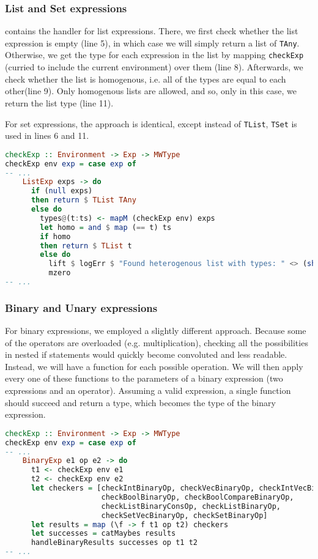 \subsubsection{List and Set expressions}
 contains the handler for list expressions. There, we first check whether the list expression is empty (line 5), in which case we will simply return a list of \lstinline{TAny}. Otherwise, we get the type for each expression in the list by mapping \lstinline{checkExp} (curried to include the current environment) over them (line 8). Afterwards, we check whether the list is homogenous, i.e. all of the types are equal to each other(line 9). Only homogenous lists are allowed, and so, only in this case, we return the list type (line 11). 
\par For set expressions, the approach is identical, except instead of \lstinline{TList}, \lstinline{TSet} is used in lines 6 and 11.
\begin{lstlisting}[language=haskell,
caption={Handler for list expressions},
label=lst:checker:lists]
checkExp :: Environment -> Exp -> MWType
checkExp env exp = case exp of
-- ...
    ListExp exps -> do
      if (null exps)
      then return $ TList TAny
      else do
        types@(t:ts) <- mapM (checkExp env) exps
        let homo = and $ map (== t) ts
        if homo
        then return $ TList t
        else do
          lift $ logErr $ "Found heterogenous list with types: " <> (show types)
          mzero
-- ...
\end{lstlisting}

\subsubsection{Binary and Unary expressions}
For binary expressions, we employed a slightly different approach. Because some of the operators are overloaded (e.g. multiplication), checking all the possibilities in nested if statements would quickly become convoluted and less readable. Instead, we will have a function for each possible operation. We will then apply every one of these functions to the parameters of a binary expression (two expressions and an operator). Assuming a valid expression, a single function should succeed and return a type, which becomes the type of the binary expression.

\begin{lstlisting}[language=haskell,
caption={Handler for binary expressions},
label=lst:checker:binary]
checkExp :: Environment -> Exp -> MWType
checkExp env exp = case exp of
-- ...
    BinaryExp e1 op e2 -> do
      t1 <- checkExp env e1
      t2 <- checkExp env e2
      let checkers = [checkIntBinaryOp, checkVecBinaryOp, checkIntVecBinaryOp,
                      checkBoolBinaryOp, checkBoolCompareBinaryOp,
                      checkListBinaryConsOp, checkListBinaryOp,
                      checkSetVecBinaryOp, checkSetBinaryOp]
      let results = map (\f -> f t1 op t2) checkers
      let successes = catMaybes results
      handleBinaryResults successes op t1 t2
-- ...
\end{lstlisting}

